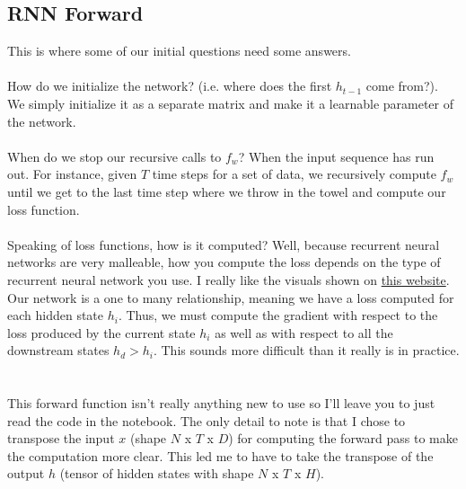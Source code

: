 \documentclass[12pt]{article}
\begin{document}
\subsection{RNN Forward}
This is where some of our initial questions need some answers. 
~\\
~\\
How do we initialize the network? 
(i.e. where does the first $h_{t-1}$ come from?). We simply initialize it as a separate matrix 
and make it a learnable parameter of the network. 
~\\
~\\
When do we stop our recursive calls to $f_w$? When the input sequence has run out. For instance, 
given $T$ time steps for a set of data, we recursively compute $f_w$ until we get to the 
last time step where we throw in the towel and compute our loss function. 
~\\
~\\
Speaking of loss functions, how is it computed? Well, because recurrent neural networks 
are very malleable, how you compute the loss depends on the type of recurrent 
neural network you use. I really like the visuals shown on \href{https://calvinfeng.gitbook.io/machine-learning-notebook/supervised-learning/recurrent-neural-network/recurrent_neural_networks}
{this website}. Our network is a one to many relationship, meaning we have a loss computed 
for each hidden state $h_i$. Thus, we must compute the gradient with respect to the loss 
produced by the current state $h_i$ as well as with respect to all the downstream 
states $h_d > h_i$. This sounds more difficult than it really is in practice. 
~\\
~\\
This forward function isn't really anything new to use so I'll leave you to just read the code in
the notebook. The only detail to note is that I chose to transpose the input $x$ (shape $N$ x $T$ x $D$)
for computing the forward pass to make the computation more clear. This led me to have to take 
the transpose of the output $h$ (tensor of hidden states with shape $N$ x $T$ x $H$). 
\end{document}
